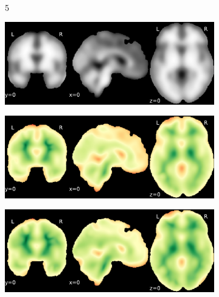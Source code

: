 \documentclass{article}
\begin{document}
\begin{landscape}
\begin{figure}
\begin{subfigure}[t]{0.2\paperheight}
        \end{subfigure} \\
        \begin{subfigure}[b][][c]{0.01\paperwidth} 5 \vspace*{15pt} \end{subfigure}
        \begin{subfigure}[t]{0.2\paperheight}
            \centering
            \includegraphics[width=\textwidth]{figures/sig/15mm/ieee_ds001748_sub-adult15.pdf}
        \end{subfigure}
        \begin{subfigure}[t]{0.2\paperheight}
            \centering
            \includegraphics[width=\textwidth]{figures/sig/15mm/rr_ds001748_sub-adult15_sig.pdf}
        \end{subfigure}
        \begin{subfigure}[t]{0.2\paperheight}
            \centering
            \includegraphics[width=\textwidth]{figures/sig/15mm/rs_ds001748_sub-adult15_sig.pdf}

\end{subfigure}
\end{figure}
\end{landscape}
\end{document}
